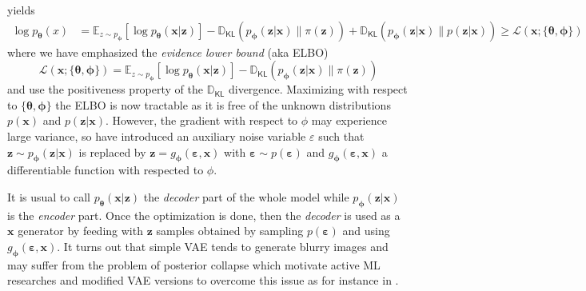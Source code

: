 \documentclass[11pt]{amsart}
\newcommand{\Esp}[0]{\ensuremath{\mathbb{E}}}
\newcommand{\DKL}[0]{\ensuremath{\mathbb{D}_{\mathsf{KL}}}}
\begin{document}
yields 
\begin{align}
\log p_{\bm{\theta}}(x)  &= \Esp_{z\sim p_{\bm{\phi}}}[\log p_{\bm{\theta}}(\bm{x}|\bm{z})] - \DKL(p_{\bm{\phi}}(\bm{z}|\bm{x})\| \pi(\bm{z})) + \DKL(p_{\bm{\phi}}(\bm{z}|\bm{x})\| p(\bm{z}|\bm{x}))
\geq \mathcal{L}(\bm{x};\{\bm{\theta},\bm{\phi}\})
\label{eq-VAE-ELBO}
\end{align}
where we have emphasized the \textit{evidence lower bound} (aka ELBO)
\begin{equation}
\mathcal{L}(\bm{x};\{\bm{\theta},\bm{\phi}\}) = \Esp_{z\sim p_{\bm{\phi}}}[\log p_{\bm{\theta}}(\bm{x}|\bm{z})] - \DKL(p_{\bm{\phi}}(\bm{z}|\bm{x})\| \pi(\bm{z}))
\end{equation}
and use the positiveness property of the $\DKL$ divergence. Maximizing with respect to 
$\{\bm{\theta},\bm{\phi}\}$ the ELBO is now tractable as it is free of the unknown distributions $p(\bm{x})$ and $p(\bm{z}|\bm{x})$. However, the gradient with respect to $\phi$ may experience large variance, so \cite{Kingma2014} have introduced an auxiliary noise variable $\varepsilon$ such that $\bm{z}\sim p_{\bm{\phi}}(\bm{z}|\bm{x})$ is replaced by $\bm{z} = g_{\bm{\phi}}(\bm{\varepsilon},\bm{x})$ with $\bm{\varepsilon} \sim p(\bm{\varepsilon})$ and $g_{\bm{\phi}}(\bm{\varepsilon},\bm{x})$ a differentiable function with respected to $\phi$. 

It is usual to call $p_{\bm{\theta}}(\bm{x}|\bm{z})$ the \textit{decoder} part of the whole model while $p_{\bm{\phi}}(\bm{z}|\bm{x})$ is the \textit{encoder} part. Once the optimization is done, then the \textit{decoder} is used as a $\bm{x}$ generator by feeding with $\bm{z}$ samples obtained by sampling $p(\bm{\varepsilon})$ and using $g_{\bm{\phi}}(\bm{\varepsilon},\bm{x})$. It turns out that simple VAE tends to generate blurry images and may  suffer from the problem of posterior collapse which motivate active ML researches \citep[e.g.][]{engel2018latent,Takida2022} and modified VAE versions to overcome this issue as for instance in \cite{Lanusse2021}. 
%
\end{document}
